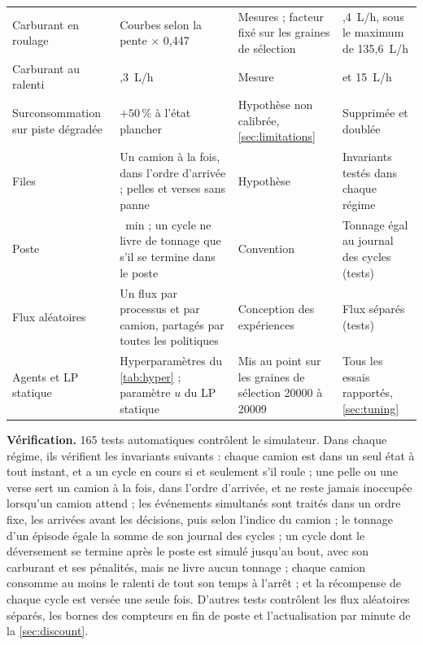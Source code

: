 \documentclass[11pt,a4paper]{article}
\newif\ifcorrmarks
\newenvironment{corrbloc}{\par\ifcorrmarks\color{corrcolor}\fi}{\par}
\begin{document}
\begin{corrbloc}
\begin{table}[H]
\begin{tabularx}{\textwidth}{>{\raggedright\arraybackslash}p{2.7cm}>{\raggedright\arraybackslash}X>{\raggedright\arraybackslash}p{3.1cm}>{\raggedright\arraybackslash}p{3.3cm}}
Carburant en roulage & Courbes selon la pente $\times$ 0,447 & Mesures \cite{Kubler2015} ; facteur fixé sur les graines de sélection & 95,4~L/h, sous le maximum de 135,6~L/h \cite{Caterpillar2019} \\
Carburant au ralenti & 11,3~L/h & Mesure \cite{Kubler2015} & 8 et 15~L/h \\
Surconsommation sur piste dégradée & $+50\,\%$ à l'état plancher & Hypothèse non calibrée, \cref{sec:limitations} & Supprimée et doublée \\
Files & Un camion à la fois, dans l'ordre d'arrivée ; pelles et verses sans panne & Hypothèse & Invariants testés dans chaque régime \\
Poste & 480~min ; un cycle ne livre de tonnage que s'il se termine dans le poste & Convention & Tonnage égal au journal des cycles (tests) \\
Flux aléatoires & Un flux par processus et par camion, partagés par toutes les politiques & Conception des expériences & Flux séparés (tests) \\
Agents et LP statique & Hyperparamètres du \cref{tab:hyper} ; paramètre $u$ du LP statique & Mis au point sur les graines de sélection 20000 à 20009 & Tous les essais rapportés, \cref{sec:tuning} \\
\bottomrule
\end{tabularx}
\end{table}

\textbf{Vérification.} 165 tests automatiques contrôlent le simulateur. Dans chaque régime, ils vérifient les invariants suivants : chaque camion est dans un seul état à tout instant, et a un cycle en cours si et seulement s'il roule ; une pelle ou une verse sert un camion à la fois, dans l'ordre d'arrivée, et ne reste jamais inoccupée lorsqu'un camion attend ; les événements simultanés sont traités dans un ordre fixe, les arrivées avant les décisions, puis selon l'indice du camion ; le tonnage d'un épisode égale la somme de son journal des cycles ; un cycle dont le déversement se termine après le poste est simulé jusqu'au bout, avec son carburant et ses pénalités, mais ne livre aucun tonnage ; chaque camion consomme au moins le ralenti de tout son temps à l'arrêt ; et la récompense de chaque cycle est versée une seule fois. D'autres tests contrôlent les flux aléatoires séparés, les bornes des compteurs en fin de poste et l'actualisation par minute de la \cref{sec:discount}.


\end{corrbloc}
\end{document}
